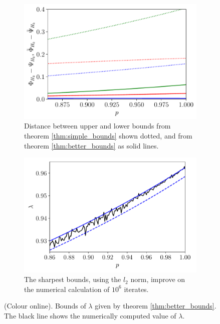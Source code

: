\documentclass{iopart}
\begin{document}
\begin{figure}
     \centering
     \begin{subfigure}[b]{0.49\textwidth}
         \centering
         \includegraphics[width=\textwidth]{ltm_better_bounds.pdf}
         \caption{Distance between upper and lower bounds from theorem \ref{thm:simple_bounds} shown dotted, and from theorem \ref{thm:better_bounds} as solid lines.}
         \label{fig:better_bounds}
     \end{subfigure}
     \hfill
     \begin{subfigure}[b]{0.49\textwidth}
         \centering
         \includegraphics[width=\textwidth]{ltm_better_bounds_zoom.pdf}
         \caption{The sharpest bounds, using the $l_2$ norm, improve on the numerical calculation of $10^6$ iterates.}
         \label{fig:better_bounds_zoom}
     \end{subfigure}
        \caption{(Colour online). Bounds of $\lambda$ given by theorem \ref{thm:better_bounds}. The black line shows the numerically computed value of $\lambda$.}
        \label{fig:better}
\end{figure}
\end{document}

